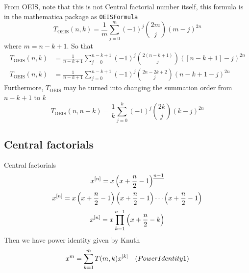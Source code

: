 From OEIS, note that this is not Central factorial number itself, this formula is in the mathematica package as
\texttt{OEISFormula}
\begin{equation*}
    T_{\mathrm{OEIS}} (n,k) = \frac{1}{m} \sum_{j=0}^{m} (-1)^{j} \binom{2m}{j} (m-j)^{2n}
\end{equation*}
where $m=n-k+1$.
So that
\begin{equation}
    \begin{split}
        T_{\mathrm{OEIS}} (n,k) &= \frac{1}{n-k+1} \sum_{j=0}^{n-k+1} (-1)^{j} \binom{2(n-k+1)}{j} ([n-k+1]-j)^{2n} \\
        T_{\mathrm{OEIS}} (n,k) &= \frac{1}{n-k+1} \sum_{j=0}^{n-k+1} (-1)^{j} \binom{2n-2k+2}{j} (n-k+1-j)^{2n}
    \end{split}\label{eq:luschny-oeis}
\end{equation}
Furthermore, $T_{\mathrm{OEIS}}$ may be turned into changing the summation order from $n-k+1$ to $k$
\begin{equation*}
    T_{\mathrm{OEIS}} (n, n-k) = \frac{1}{k} \sum_{j=0}^{k} (-1)^{j} \binom{2k}{j} (k-j)^{2n}
\end{equation*}

\subsection{Central factorials}\label{subsec:central-factorials}
Central factorials
\begin{equation*}
    x^{[n]} = x \left(x+\frac{n}{2}-1 \right)^{\underline{n-1}}
\end{equation*}
\begin{equation*}
    x^{[n]} = x \left( x+\frac{n}{2}-1 \right) \left( x+\frac{n}{2}-1 \right) \cdots \left (x+\frac{n}{2}-1 \right)
\end{equation*}
\begin{equation*}
    x^{[n]} = x \prod_{k=1}^{n-1} \left( x+\frac{n}{2}-k \right)
\end{equation*}
Then we have power identity given by Knuth
\begin{equation*}
    x^m = \sum_{k=1}^{m} T(m, k) x^{[k]} \quad
    (PowerIdentity1)
\end{equation*}